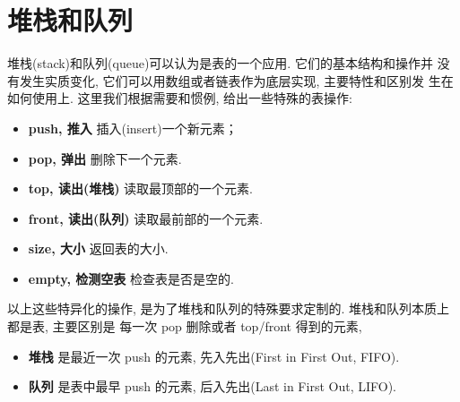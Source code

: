 \documentclass[a4paper]{ctexart}
\theoremstyle{definition}
\theoremstyle{definition}
\begin{document}



\section{堆栈和队列}

堆栈(stack)和队列(queue)可以认为是表的一个应用. 它们的基本结构和操作并
没有发生实质变化, 它们可以用数组或者链表作为底层实现, 主要特性和区别发
生在如何使用上. 这里我们根据需要和惯例, 给出一些特殊的表操作:
\begin{itemize}
  \item {\bf push, 推入} 插入(insert)一个新元素；
  \item {\bf pop, 弹出} 删除下一个元素. 
  \item {\bf top, 读出(堆栈)} 读取最顶部的一个元素.
  \item {\bf front, 读出(队列)} 读取最前部的一个元素.
  \item {\bf size, 大小} 返回表的大小.
  \item {\bf empty, 检测空表} 检查表是否是空的.
  
\end{itemize}

以上这些特异化的操作, 是为了堆栈和队列的特殊要求定制的. 堆栈和队列本质上都是表, 主要区别是
每一次 pop 删除或者 top/front 得到的元素,
\begin{itemize}
\item {\bf 堆栈} 是最近一次 push 的元素, 先入先出(First in First Out,
  FIFO).
\item {\bf 队列} 是表中最早 push 的元素, 后入先出(Last in First Out,
  LIFO).
\end{itemize}
\end{document}
